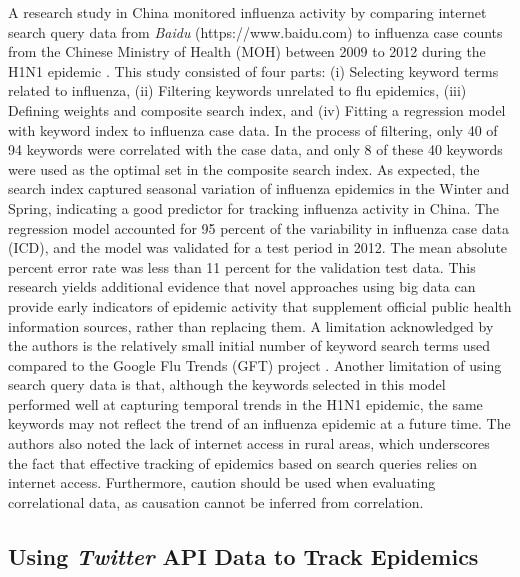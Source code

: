 \documentclass[sigconf]{acmart}
\begin{document}
A research study in China monitored influenza activity by comparing internet search query 
data from {\it Baidu} (https://www.baidu.com) to influenza case counts from the Chinese 
Ministry of Health (MOH) between 2009 to 2012 during the H1N1 epidemic \cite{yuan13}. 
This study consisted of four parts: (i) Selecting keyword terms related to influenza, (ii) 
Filtering keywords unrelated to flu epidemics, (iii) Defining weights and composite search 
index, and (iv) Fitting a regression model with keyword index to influenza case data. In the 
process of filtering, only 40 of 94 keywords were correlated with the case data, and only 8 
of these 40 keywords were used as the optimal set in the composite search index. As expected,
the search index captured seasonal variation of influenza epidemics in the Winter and Spring,
indicating a good predictor for tracking influenza activity in China.  The regression model 
accounted for 95 percent of the variability in influenza case data (ICD), and the model was 
validated for a test period in 2012. The mean absolute percent error rate was less than 11 
percent for the validation test data. This research yields additional evidence that novel 
approaches using big data can provide early indicators of epidemic activity that supplement 
official public health information sources, rather than replacing them. A limitation 
acknowledged by the authors is the relatively small initial number of keyword search terms 
used compared to the Google Flu Trends (GFT) project \cite{ginsburg09}. Another limitation 
of using search query data is that, although the keywords selected in this model performed 
well at capturing temporal trends in the H1N1 epidemic, the same keywords may not reflect 
the trend of an influenza epidemic at a future time. The authors also noted the lack of 
internet access in rural areas, which underscores the fact that effective tracking of 
epidemics based on search queries relies on internet access. Furthermore, caution should 
be used when evaluating correlational data, as causation cannot be inferred from correlation.

\subsection{Using {\itshape Twitter} API Data to Track Epidemics}
\end{document}
